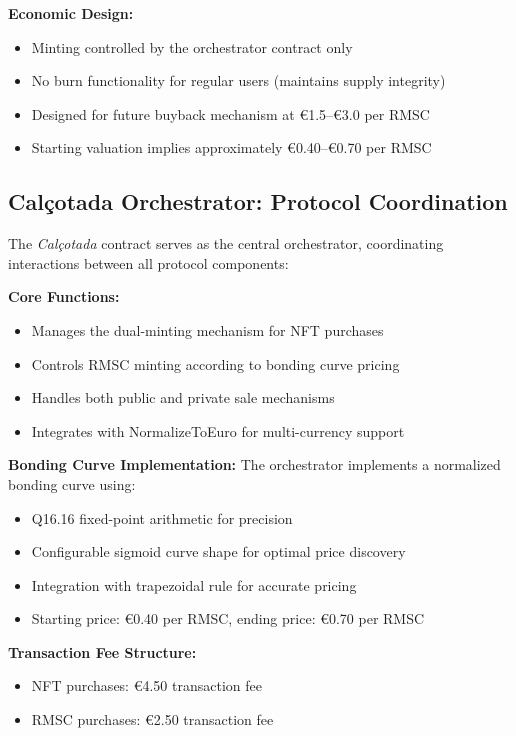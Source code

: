 \documentclass[conference]{IEEEtran}
\begin{document}
\textbf{Economic Design:}
\begin{itemize}
    \item Minting controlled by the orchestrator contract only
    \item No burn functionality for regular users (maintains supply integrity)
    \item Designed for future buyback mechanism at €1.5–€3.0 per RMSC
    \item Starting valuation implies approximately €0.40–€0.70 per RMSC
\end{itemize}


\subsection{Calçotada Orchestrator: Protocol Coordination}

The \textit{Calçotada} contract serves as the central orchestrator, coordinating interactions between all protocol components:

\textbf{Core Functions:}
\begin{itemize}
    \item Manages the dual-minting mechanism for NFT purchases
    \item Controls RMSC minting according to bonding curve pricing
    \item Handles both public and private sale mechanisms
    \item Integrates with NormalizeToEuro for multi-currency support
\end{itemize}

\textbf{Bonding Curve Implementation:}
The orchestrator implements a normalized bonding curve using:
\begin{itemize}
    \item Q16.16 fixed-point arithmetic for precision
    \item Configurable sigmoid curve shape for optimal price discovery
    \item Integration with trapezoidal rule for accurate pricing
    \item Starting price: €0.40 per RMSC, ending price: €0.70 per RMSC
\end{itemize}

\textbf{Transaction Fee Structure:}
\begin{itemize}
    \item NFT purchases: €4.50 transaction fee
    \item RMSC purchases: €2.50 transaction fee
\end{itemize}
\end{document}
